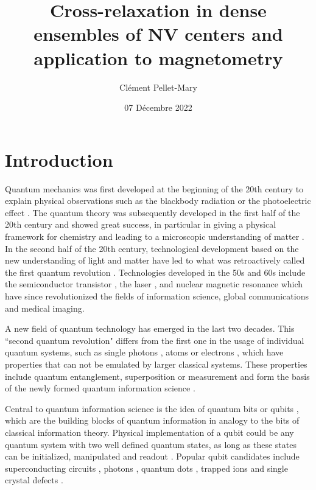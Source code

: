 \documentclass[a4paper, 11pt]{book}
\title{Cross-relaxation in dense ensembles of NV centers and application to magnetometry}
\author{Clément Pellet-Mary}
\institute{ENS Paris}
\date{07 Décembre 2022}
\begin{document}
\maketitle{}
\setcounter{tocdepth}{1}

\tableofcontents
 
\chapter*{Introduction}

Quantum mechanics was first developed at the beginning of the 20th century to explain physical observations such as the blackbody radiation \citep{planck1900theorie} or the photoelectric effect \citep{einstein1905erzeugung}. The quantum theory was subsequently developed in the first half of the 20th century and showed great success, in particular in giving a physical framework for chemistry \citep{pauling1931nature} and leading to a microscopic understanding of matter \citep{kittel1996introduction}. In the second half of the 20th century, technological development based on the new understanding of light and matter have led to what was retroactively called the first quantum revolution \citep{thew2019focus}. Technologies developed in the 50s and 60s include the semiconductor transistor \citep{bardeen1948transistor}, the laser \citep{maiman1960stimulated}, and nuclear magnetic resonance \citep{abragam1961principles} which have since revolutionized the fields of information science, global communications and medical imaging. 

A new field of quantum technology has emerged in the last two decades. This ``second quantum revolution" differs from the first one in the usage of individual quantum systems, such as single photons \citep{gleyzes2007quantum}, atoms \citep{neuhauser1980localized} or electrons \citep{peil1999observing}, which have properties that can not be emulated by larger classical systems. These properties include quantum entanglement, superposition or measurement and form the basis of the newly formed quantum information science \citep{nielsen2002quantum, vedral2006introduction, hayashi2006quantum}. 

Central to quantum information science is the idea of quantum bits or qubits \citep{schumacher1996sending}, which are the building blocks of quantum information in analogy to the bits of classical information theory. Physical implementation of a qubit could be any quantum system with two well defined quantum states, as long as these states can be initialized, manipulated and readout \citep{divincenzo2000physical}. Popular qubit candidates include superconducting circuits \citep{nakamura1999coherent, orlando1999superconducting}, photons \citep{bennett1992quantum, zhong2020quantum}, quantum dots \citep{veldhorst2014addressable, zajac2018resonantly}, trapped ions \citep{friis2018observation, wright2019benchmarking} and single crystal defects \citep{jelezko2006single, baranov2011silicon, zhong2015optically}.
\end{document}
